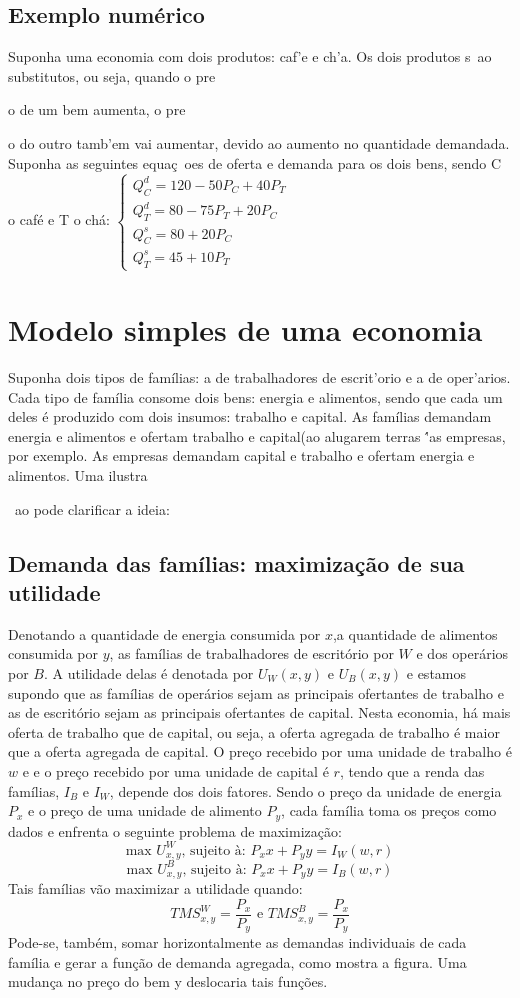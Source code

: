 \documentclass[oneside,12pt, letterpaper]{book}
\begin{document}
\section{Exemplo num{\'e}rico}
Suponha uma economia com dois produtos: caf{'e} e ch{'a}. Os dois produtos s{~a}o substitutos, ou seja, quando o pre{o de um bem aumenta, o pre{o do outro tamb{'e}m vai
aumentar, devido ao aumento no quantidade demandada. Suponha as seguintes equa{\c c}{~o}es de oferta e demanda para os dois bens, sendo C o caf{\'e} e T o ch{\'a}: 
\newline $ \begin{cases} Q^d_C = 120 - 50P_C + 40P_T \\ Q^d_T = 80 - 75P_T + 20P_C \\ Q^s_C = 80 + 20P_C \\ Q^s_T = 45 + 10P_T  \end{cases}   $

\chapter{Modelo simples de uma economia}
Suponha dois tipos de fam{\'i}lias: a de trabalhadores de escrit{'o}rio e a de oper{'a}rios. Cada tipo de fam{\'i}lia consome dois bens: energia e alimentos, sendo que
cada um deles {\'e} produzido com dois insumos: trabalho e capital. As fam{\'i}lias demandam energia e alimentos e ofertam trabalho e capital(ao alugarem
terras {\''a}s empresas, por exemplo. As empresas demandam capital e trabalho e ofertam energia e alimentos. Uma ilustra{{~a}o pode clarificar a ideia:
\section{Demanda das fam{\'i}lias: maximiza{\c c}{\~a}o de sua utilidade} 
Denotando a quantidade de energia consumida por $x$,a quantidade de alimentos consumida por $y$, as fam{\'i}lias de trabalhadores de escrit{\'o}rio por $W$ e dos
oper{\'a}rios por $B$. A utilidade delas {\'e} denotada por $U_W(x,y)$ e $U_B(x,y)$ e estamos supondo que as fam{\'i}lias de oper{\'a}rios sejam as principais ofertantes de
trabalho e as de escrit{\'o}rio sejam as principais ofertantes de capital. Nesta economia, h{\'a} mais oferta de trabalho que de capital, ou seja, a oferta agregada de
trabalho {\'e} maior que a oferta agregada de capital. O pre{\c c}o recebido por uma unidade de trabalho {\'e} $w$ e e o pre{\c c}o recebido por uma unidade de capital {\'e} $r$,
tendo que a renda das fam{\'i}lias, $I_B$ e $I_W$, depende dos dois fatores. Sendo o pre{\c c}o da unidade de energia $P_x$ e o pre{\c c}o de uma unidade de alimento $P_y$, cada
fam{\'i}lia toma os pre{\c c}os como dados e enfrenta o seguinte problema de maximiza{\c c}{\~a}o: \[ \text{max }U^W_{x,y}  \text{, sujeito {\`a}: }P_xx + P_yy = I_W(w,r)  \]
\[ \text{max }U^B_{x,y}  \text{, sujeito {\`a}: }P_xx + P_yy = I_B(w,r)  \] 
Tais fam{\'i}lias v{\~a}o maximizar a utilidade quando: 
\[ TMS^W_{x,y} = \frac{P_x}{P_y} \text{   e   } TMS^B_{x,y} = \frac{P_x}{P_y} \]
Pode-se, tamb{\'e}m, somar horizontalmente as demandas individuais de cada fam{\'i}lia e gerar a fun{\c c}{\~a}o de demanda agregada, como mostra a figura. Uma mudan{\c c}a no pre{\c c}o
do bem y deslocaria tais fun{\c c}{\~o}es. 
}}}
\end{document}
